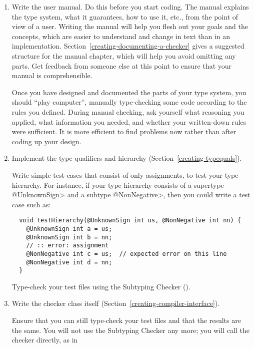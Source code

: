 \begin{enumerate}
\item
\label{creating-tips-write-manual}
  Write the user manual.  Do this before you start coding.  The manual
  explains the type system, what it guarantees, how to use it, etc., from
  the point of view of a user.  Writing the manual will help you flesh out
  your goals and the concepts, which are easier to understand and change in
  text than in an implementation.
  Section~\ref{creating-documenting-a-checker} gives a suggested structure
  for the manual chapter, which will help you avoid omitting any parts.
  Get feedback from someone else at this point to ensure that your manual
  is comprehensible.

  Once you have designed and documented the parts of your type system, you
  should ``play computer'', manually
  type-checking some code according to the rules you defined.
  During manual checking, ask
  yourself what reasoning you applied, what information you needed, and
  whether your written-down rules were sufficient.
  It is more efficient to find problems now rather than after coding up
  your design.

\item
\label{creating-tips-implement-qualifiers}
  Implement the type qualifiers and hierarchy
  (Section~\ref{creating-typequals}).

  Write simple test cases that consist of only assignments,
  to test your type hierarchy.  For instance, if
  your type hierarchy consists of a supertype \<@UnknownSign> and a subtype
  \<@NonNegative>, then you could write a test case such as:

\begin{Verbatim}
  void testHierarchy(@UnknownSign int us, @NonNegative int nn) {
    @UnknownSign int a = us;
    @UnknownSign int b = nn;
    // :: error: assignment
    @NonNegative int c = us;  // expected error on this line
    @NonNegative int d = nn;
  }
\end{Verbatim}

  Type-check your test files using the Subtyping Checker
  ().

\item
\label{creating-tips-implement-checker}
  Write the checker class itself
  (Section~\ref{creating-compiler-interface}).

  Ensure that you can still type-check your test files and that the results
  are the same.  You will not use the Subtyping Checker any more; you will
  call the checker directly, as in


\end{enumerate}
